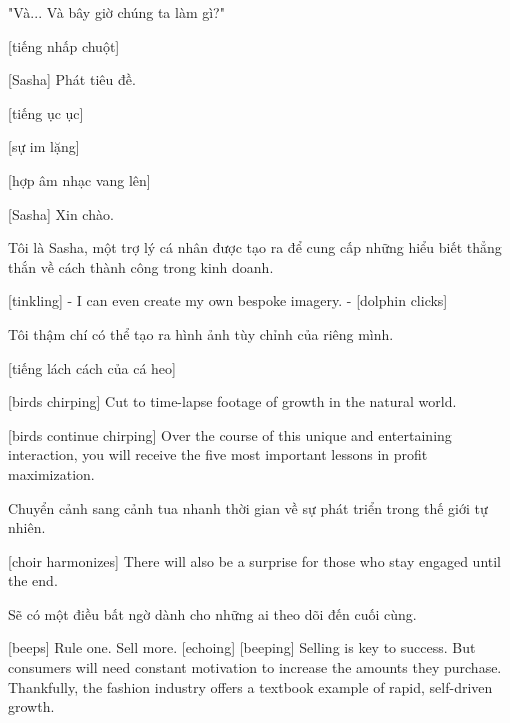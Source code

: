 \documentclass[a4paper]{article}
\begin{document}
	\begin{vietnamese-v2}
		"Và... Và bây giờ chúng ta làm gì?"
		
		[tiếng nhấp chuột]
		
		[Sasha] Phát tiêu đề.
		
		[tiếng ục ục]
		
		[sự im lặng]
		
		[hợp âm nhạc vang lên]
		
		[Sasha] Xin chào.
		
		Tôi là Sasha, một trợ lý cá nhân được tạo ra để cung cấp những hiểu biết thẳng thắn về cách thành công trong kinh doanh.
	\end{vietnamese-v2}
	
	
	
	[tinkling]
	- I can even create my own bespoke imagery. 
	- [dolphin clicks]
	
	\begin{vietnamese-v2}
		
		Tôi thậm chí có thể tạo ra hình ảnh tùy chỉnh của riêng mình.
		
		[tiếng lách cách của cá heo]
	\end{vietnamese-v2}
	
	[birds chirping]
	Cut to time-lapse footage of growth in the natural world.
	
	
	[birds continue chirping]
	Over the course of this unique and entertaining interaction, you will receive the five most important lessons in profit maximization.
	
	\begin{vietnamese-v2}
		
		Chuyển cảnh sang cảnh tua nhanh thời gian về sự phát triển trong thế giới tự nhiên.
	\end{vietnamese-v2}
	
	
	[choir harmonizes]
	There will also be a surprise for those who stay engaged until the end.
	
	\begin{vietnamese-v2}
		
		Sẽ có một điều bất ngờ dành cho những ai theo dõi đến cuối cùng.
	\end{vietnamese-v2}
	
	[beeps]
	Rule one.
	Sell more. [echoing]
	[beeping]
	Selling is key to success. But consumers will need constant motivation to increase the amounts they purchase.
	Thankfully, the fashion industry offers a textbook example of rapid, self-driven growth.
	
\end{document}
